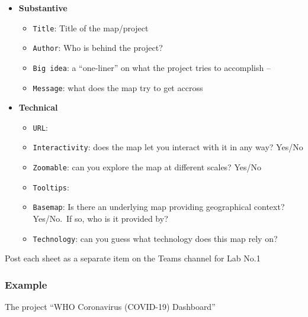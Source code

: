\documentclass[
  letterpaper,
  DIV=11,
  numbers=noendperiod]{scrreprt}
\providecommand{\tightlist}{%
  \setlength{\itemsep}{0pt}\setlength{\parskip}{0pt}}\usepackage{longtable,booktabs,array}
\begin{document}
\begin{itemize}
\tightlist
\item
  \textbf{Substantive}

  \begin{itemize}
  \tightlist
  \item
    \texttt{Title}: Title of the map/project
  \item
    \texttt{Author}: Who is behind the project?
  \item
    \texttt{Big\ idea}: a ``one-liner'' on what the project tries to
    accomplish --
  \item
    \texttt{Message}: what does the map try to get accross
  \end{itemize}
\item
  \textbf{Technical}

  \begin{itemize}
  \tightlist
  \item
    \texttt{URL}:
  \item
    \texttt{Interactivity}: does the map let you interact with it in any
    way? Yes/No
  \item
    \texttt{Zoomable}: can you explore the map at different scales?
    Yes/No
  \item
    \texttt{Tooltips}:
  \item
    \texttt{Basemap}: Is there an underlying map providing geographical
    context? Yes/No.~If so, who is it provided by?
  \item
    \texttt{Technology}: can you guess what technology does this map
    rely on?
  \end{itemize}
\end{itemize}

Post each sheet as a separate item on the Teams channel for Lab No.1

\hypertarget{example}{%
\subsubsection{Example}\label{example}}

The project ``WHO Coronavirus (COVID-19) Dashboard''
\end{document}
